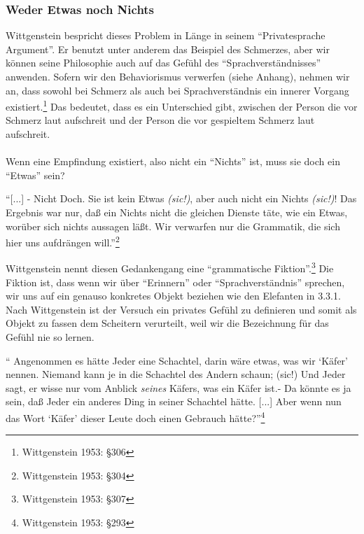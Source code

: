 \documentclass[10pt,a4paper]{article}
\begin{document}
\subsubsection{Weder Etwas noch Nichts}
Wittgenstein bespricht dieses Problem in Länge in seinem \enquote{Privatesprache Argument}. Er benutzt unter anderem das Beispiel des Schmerzes, aber wir können seine Philosophie auch auf das Gefühl des \enquote{Sprachverständnisses} anwenden. Sofern wir den Behaviorismus verwerfen (siehe Anhang), nehmen wir an, dass sowohl bei Schmerz als auch bei Sprachverständnis ein innerer Vorgang existiert.\footnote{Wittgenstein 1953: §306} Das bedeutet, dass es ein Unterschied gibt, zwischen der Person die vor Schmerz laut aufschreit und der Person die vor gespieltem Schmerz laut aufschreit. \\
\\
Wenn eine Empfindung existiert, also nicht ein \enquote{Nichts} ist, muss sie doch ein \enquote{Etwas} sein?

\begin{displayquote}
\enquote{[...] - Nicht Doch. Sie ist kein Etwas \textit{(sic!)}, aber auch nicht ein Nichts \textit{(sic!)}! Das Ergebnis war nur, daß ein Nichts nicht die gleichen Dienste täte, wie ein Etwas, worüber sich nichts aussagen läßt. Wir verwarfen nur die Grammatik, die sich hier uns aufdrängen will.}\footnote{Wittgenstein 1953: §304}
\end{displayquote}
Wittgenstein nennt diesen Gedankengang eine \enquote{grammatische Fiktion}.\footnote{Wittgenstein 1953: §307} Die Fiktion ist, dass wenn wir über \enquote{Erinnern} oder \enquote{Sprachverständnis} sprechen, wir uns auf ein genauso konkretes Objekt beziehen wie den Elefanten in 3.3.1. Nach Wittgenstein ist der Versuch ein privates Gefühl zu definieren und somit als Objekt zu fassen dem Scheitern verurteilt, weil wir die Bezeichnung für das Gefühl nie so lernen.

\begin{displayquote}
\enquote{
Angenommen es hätte Jeder eine Schachtel, darin wäre etwas, was wir \enquote{Käfer} nennen. Niemand kann je in die Schachtel des Andern schaun; (sic!) Und Jeder sagt, er wisse nur vom Anblick \textit{seines} Käfers, was ein Käfer ist.- Da könnte es ja sein, daß Jeder ein anderes Ding in seiner Schachtel hätte. [...] Aber wenn nun das Wort \enquote{Käfer} dieser Leute doch einen Gebrauch hätte?}\footnote{Wittgenstein 1953: §293}
\end{displayquote}
\end{document}

